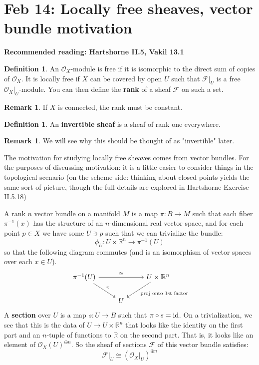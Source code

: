 \documentclass[10pt,reqno]{amsart}
\theoremstyle{definition}
\newtheorem{definition}[theorem]{Definition}
\newtheorem{remark}[theorem]{Remark}
\theoremstyle{remark}
\numberwithin{equation}{section}
\numberwithin{theorem}{section}
\newcommand{\OO}{{\mathcal O}}
\newcommand{\R}{{\mathbb R}}
\newcommand{\FF}{{\mathscr F}}
\begin{document}
\section{Feb 14: Locally free sheaves, vector bundle motivation}
\textbf{Recommended reading: Hartshorne II.5, Vakil 13.1} 

\begin{definition} An $\OO_X$-module is free if it is isomorphic to the direct sum of copies of $\OO_X$. It is locally free if $X$ can be covered by open $U$ such that $\FF|_U$ is a free $\OO_X|_U$-module. You can then define the \textbf{rank} of a sheaf $\FF$ on such a set.
\end{definition}

\begin{remark}  If $X$ is connected, the rank must be constant.
\end{remark}

\begin{definition} An \textbf{invertible sheaf} is a sheaf of rank one everywhere. 
\end{definition}

\begin{remark} We will see why this should be thought of as "invertible" later.
\end{remark}

The motivation for studying locally free sheaves comes from vector bundles. For the purposes of discussing motivation: it is a little easier to consider things in the topological scenario (on the scheme side: thinking about closed points yields the same sort of picture, though the full details are explored in Hartshorne Exercise II.5.18)

A rank $n$ vector bundle on a manifold $M$ is a map $\pi: B \to M$ such that each fiber $\pi^{-1}(x)$ has the structure of an $n$-dimensional real vector space, and for each point $p \in X$ we have some $U \ni p$ such that we can trivialize the bundle:
\[\phi_U: U \times \R^n \to \pi^{-1}(U)\]
so that the following diagram commutes (and is an isomorphism of vector spaces over each $x \in U$).
\[\begin{tikzcd}
\pi^{-1}(U)\arrow[rr,  "\cong"] \arrow[dr,"\pi"]& & U \times \R^n \arrow[dl,"\textup{proj onto 1st factor}"] \\
 & U &
\end{tikzcd}\]
A \textbf{section} over $U$ is a map $s: U \to B$ such that $\pi \circ s = \textup{id}$. On a trivialization, we see that this is the data of $U \to U \times \R^n$ that looks like the identity on the first part and an $n$-tuple of functions to $\R$ on the second part. That is, it looks like an element of $\OO_{X}(U)^{\oplus n}$. So the sheaf of sections $\FF$ of this vector bundle satisfies:
\[\FF|_{U} \cong ({\OO_{X}}|_{U})^{\oplus n}\]
\end{document}
